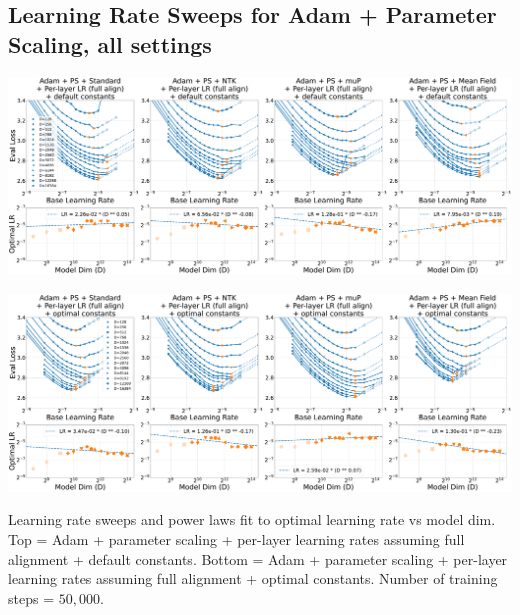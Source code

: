 \thispagestyle{plain}
\begin{SidewaysFigure}
\subsection{Learning Rate Sweeps for Adam + Parameter Scaling, all settings}
\label{sec:app_lr_sweeps_adam_ps}
\vspace{12pt}
\includegraphics[width=0.98\linewidth]{icml2024/figures/lr_sweeps/appendix/adam_ps/adam_ps+50k_steps_per_module_lr.pdf}

\figvspace

\includegraphics[width=0.98\linewidth]{icml2024/figures/lr_sweeps/appendix/adam_ps/adam_ps+50k_steps_per_module_lr_optimal_constants.pdf}
\caption{Learning rate sweeps and power laws fit to optimal learning rate vs model dim. Top = Adam + parameter scaling + per-layer learning rates assuming full alignment + default constants. Bottom = Adam + parameter scaling + per-layer learning rates assuming full alignment + optimal constants. Number of training steps = $50{,}000$.}
\label{fig:lr_sweep_adam_ps_full_align}
\end{SidewaysFigure}
\clearpage

